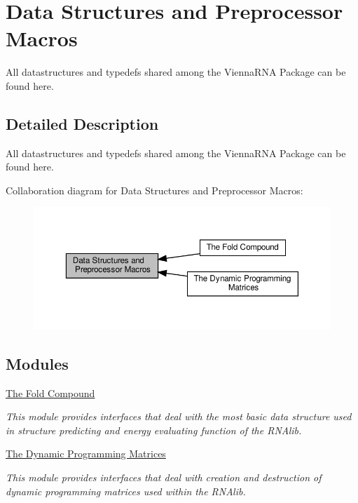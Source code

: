 \hypertarget{group__data__structures}{}\section{Data Structures and Preprocessor Macros}
\label{group__data__structures}


All datastructures and typedefs shared among the Vienna\+R\+NA Package can be found here.  




\subsection{Detailed Description}
All datastructures and typedefs shared among the Vienna\+R\+NA Package can be found here. 

Collaboration diagram for Data Structures and Preprocessor Macros\+:
\nopagebreak
\begin{figure}[H]
\begin{center}
\leavevmode
\includegraphics[width=350pt]{group__data__structures}
\end{center}
\end{figure}
\subsection*{Modules}
\begin{DoxyCompactItemize}
\item 
\hyperlink{group__fold__compound}{The Fold Compound}
\begin{DoxyCompactList}\small\item\em This module provides interfaces that deal with the most basic data structure used in structure predicting and energy evaluating function of the R\+N\+Alib. \end{DoxyCompactList}\item 
\hyperlink{group__dp__matrices}{The Dynamic Programming Matrices}
\begin{DoxyCompactList}\small\item\em This module provides interfaces that deal with creation and destruction of dynamic programming matrices used within the R\+N\+Alib. \end{DoxyCompactList}\end{DoxyCompactItemize}
